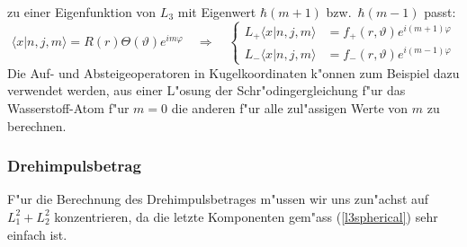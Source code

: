 zu einer Eigenfunktion von $L_3$ mit Eigenwert $\hbar(m+1)$ bzw.~$\hbar(m-1)$
passt:
\begin{equation*}
\langle x|n,j,m\rangle
=
R(r)\Theta(\vartheta)e^{im\varphi}
\quad\Rightarrow\quad
\left\{
\begin{aligned}
L_+
\langle x|n,j,m\rangle
&=
f_+(r,\vartheta)
e^{i(m+1)\varphi}
\\
L_-
\langle x|n,j,m\rangle
&=
f_-(r,\vartheta)
e^{i(m-1)\varphi}
\end{aligned}
\right.
\end{equation*}
Die Auf- und Absteigeoperatoren in Kugelkoordinaten k"onnen zum
Beispiel dazu verwendet werden, aus einer L"osung der Schr"odingergleichung
f"ur das Wasserstoff-Atom f"ur $m=0$ die anderen f"ur alle zul"assigen
Werte von $m$ zu berechnen.

\subsubsection{Drehimpulsbetrag}
F"ur die Berechnung des Drehimpulsbetrages m"ussen wir uns zun"achst
auf $L_1^2+L_2^2$ konzentrieren, da die letzte Komponenten gem"ass
(\ref{l3spherical}) sehr einfach ist.
